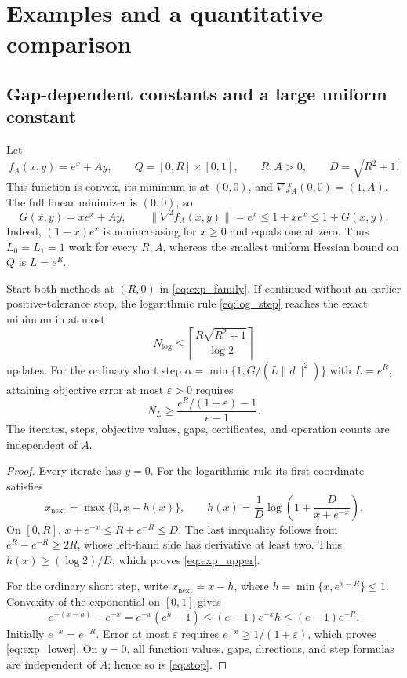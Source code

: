 \section{Examples and a quantitative comparison}\label{sec:examples}
\subsection{Gap-dependent constants and a large uniform constant}
Let
\begin{equation}\label{eq:exp_family}
 f_A(x,y)=e^x+Ay,\qquad
 Q=[0,R]\times[0,1],\qquad R,A>0,\qquad D=\sqrt{R^2+1}.
\end{equation}
This function is convex, its minimum is at $(0,0)$, and
$\nabla f_A(0,0)=(1,A)$.
The full linear minimizer is $(0,0)$, so
\[
 G(x,y)=xe^x+Ay,\qquad
 \|\nabla^2 f_A(x,y)\|=e^x\le1+xe^x\le1+G(x,y).
\]
Indeed, $(1-x)e^x$ is nonincreasing for $x\ge0$ and equals one
at zero. Thus $L_0=L_1=1$ work for every $R,A$, whereas the
smallest uniform Hessian bound on $Q$ is $L=e^R$.

\begin{theorem}\label{thm:separation}
Start both methods at $(R,0)$ in \eqref{eq:exp_family}.
If continued without an earlier positive-tolerance stop, the
logarithmic rule \eqref{eq:log_step} reaches the exact minimum
in at most
\begin{equation}\label{eq:exp_upper}
 N_{\log}\le\left\lceil\frac{R\sqrt{R^2+1}}{\log2}\right\rceil
\end{equation}
updates. For the ordinary short step
$\alpha=\min\{1,G/(L\|d\|^2)\}$ with $L=e^R$,
attaining objective error at most $\varepsilon>0$ requires
\begin{equation}\label{eq:exp_lower}
 N_L\ge\frac{e^R/(1+\varepsilon)-1}{e-1}.
\end{equation}
The iterates, steps, objective values, gaps, certificates, and
operation counts are independent of $A$.
\end{theorem}
\begin{proof}
Every iterate has $y=0$. For the logarithmic rule its first coordinate
satisfies
\[
 x_{\mathrm{next}}=\max\{0,x-h(x)\},\qquad
 h(x)=\frac1D\log\left(1+\frac{D}{x+e^{-x}}\right).
\]
On $[0,R]$, $x+e^{-x}\le R+e^{-R}\le D$. The last inequality
follows from $e^R-e^{-R}\ge2R$, whose left-hand side has derivative
at least two.
Thus $h(x)\ge(\log2)/D$, which proves \eqref{eq:exp_upper}.

For the ordinary short step, write
$x_{\mathrm{next}}=x-h$, where $h=\min\{x,e^{x-R}\}\le1$.
Convexity of the exponential on $[0,1]$ gives
\[
 e^{-(x-h)}-e^{-x}
 =e^{-x}(e^h-1)
 \le(e-1)e^{-x}h\le(e-1)e^{-R}.
\]
Initially $e^{-x}=e^{-R}$. Error at most $\varepsilon$ requires
$e^{-x}\ge1/(1+\varepsilon)$, which proves \eqref{eq:exp_lower}.
On $y=0$, all function values, gaps, directions, and step formulas
are independent of $A$; hence so is \eqref{eq:stop}.
\end{proof}


